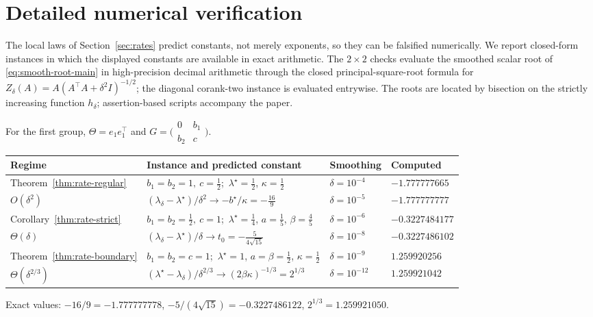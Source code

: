 \section{Detailed numerical verification}
\label{sec:supp-numerics}

The local laws of Section~\ref{sec:rates} predict constants, not merely exponents, so
they can be falsified numerically.  We report closed-form instances in which
the displayed constants are available in exact arithmetic.  The
\(2\times2\) checks evaluate the smoothed scalar root of
\eqref{eq:smooth-root-main} in high-precision decimal arithmetic through the
closed principal-square-root formula for
\(Z_\delta(A)=A(A^\top A+\delta^2I)^{-1/2}\); the diagonal corank-two
instance is evaluated entrywise.  The roots are located by
bisection on the strictly increasing function \(h_\delta\); assertion-based
scripts accompany the paper.

For the first group, \(\Theta=e_1e_1^\top\) and
\(G=\bigl(\begin{smallmatrix}0&b_1\\b_2&c\end{smallmatrix}\bigr)\).

\begin{center}
\begin{tabular}{@{}llll@{}}
\toprule
Regime & Instance and predicted constant & Smoothing & Computed \\
\midrule
Theorem~\ref{thm:rate-regular} &
\(b_1=b_2=1,\ c=\tfrac12\);\ \(\lambda^\star=\tfrac12\), \(\kappa=\tfrac12\) &
\(\delta=10^{-4}\) & \(-1.777777665\)\\
\(O(\delta^2)\) &
\((\lambda_\delta-\lambda^\star)/\delta^2\to-b^\star/\kappa=-\tfrac{16}{9}\)
&\(\delta=10^{-5}\) & \(-1.777777777\)\\
\addlinespace
Corollary~\ref{thm:rate-strict} &
\(b_1=b_2=\tfrac12,\ c=1\);\ \(\lambda^\star=\tfrac14\),
\(a=\tfrac15\), \(\beta=\tfrac45\) &
\(\delta=10^{-6}\) & \(-0.3227484177\)\\
\(\Theta(\delta)\) &
\((\lambda_\delta-\lambda^\star)/\delta\to t_0=-\tfrac{5}{4\sqrt{15}}\)
& \(\delta=10^{-8}\) & \(-0.3227486102\)\\
\addlinespace
Theorem~\ref{thm:rate-boundary} &
\(b_1=b_2=c=1\);\ \(\lambda^\star=1\), \(a=\beta=\tfrac12\), \(\kappa=\tfrac12\) &
\(\delta=10^{-9}\) & \(1.259920256\)\\
\(\Theta(\delta^{2/3})\) &
\((\lambda^\star-\lambda_\delta)/\delta^{2/3}\to(2\beta\kappa)^{-1/3}=2^{1/3}\)
& \(\delta=10^{-12}\) & \(1.259921042\)\\
\bottomrule
\end{tabular}

\smallskip
{\small
Exact values: \(-16/9=-1.777777778\),
\(-5/(4\sqrt{15})=-0.3227486122\),
\(2^{1/3}=1.259921050\).}
\end{center}

